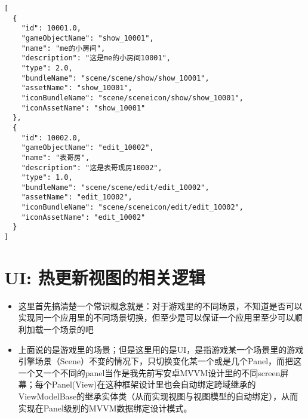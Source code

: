 \documentclass[9pt, b5paper]{article}
\begin{document}
\begin{verbatim}
[
  {
    "id": 10001.0,
    "gameObjectName": "show_10001",
    "name": "me的小房间",
    "description": "这是me的小房间10001",
    "type": 2.0,
    "bundleName": "scene/scene/show/show_10001",
    "assetName": "show_10001",
    "iconBundleName": "scene/sceneicon/show/show_10001",
    "iconAssetName": "show_10001"
  },
  {
    "id": 10002.0,
    "gameObjectName": "edit_10002",
    "name": "表哥房",
    "description": "这是表哥现房10002",
    "type": 1.0,
    "bundleName": "scene/scene/edit/edit_10002",
    "assetName": "edit_10002",
    "iconBundleName": "scene/sceneicon/edit/edit_10002",
    "iconAssetName": "edit_10002"
  }
]
\end{verbatim}
\section{UI: 热更新视图的相关逻辑}
\label{sec-3}
\begin{itemize}
\item 这里首先搞清楚一个常识概念就是：对于游戏里的不同场景，不知道是否可以实现同一个应用里的不同场景切换，但至少是可以保证一个应用里至少可以顺利加载一个场景的吧
\item 上面说的是游戏里的场景；但是这里用的是UI，是指游戏某一个场景里的游戏引擎场景（Scene）不变的情况下，只切换变化某一个或是几个Panel，而把这一个又一个不同的panel当作是我先前写安卓MVVM设计里的不同screen屏幕；每个Panel(View)在这种框架设计里也会自动绑定跨域继承的ViewModelBase的继承实体类（从而实现视图与视图模型的自动绑定），从而实现在Panel级别的MVVM数据绑定设计模式。
\end{itemize}
\end{document}
